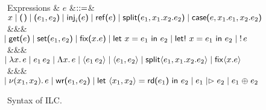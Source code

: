 \begin{figure*}[t]
\begin{comment}
    \tyTensor{X}{Y}$
    \\
    Affine typings
    & $\Delta$
    &$\bnfas$& $\emptyctxt \bnfalt \Delta,x:X \bnfalt \Delta, \wrtok$
  \end{grammar}
  \end{comment}
  \begin{grammar}
    Expressions
    & $e$
        &$\bnfas$&
        $\eVar{x} \bnfalt \eUnit \bnfalt \ePair{e_1}{e_2} \bnfalt \eInj{i}{e}
    \bnfalt \eRef{e} \bnfalt \eSplit{e_1}{x_1}{x_2}{e_2} \bnfalt
    \eCase{e}{x_1}{e_1}{x_2}{e_2}$
    \\ &&& $\bnfaltbrk \eGet{e} \bnfalt \eSet{e_1}{e_2} \bnfalt \eFix{x}{e}
    \bnfalt \eLet{x}{e_1}{e_2} \bnfalt \eLetBang{x}{e_1}{e_2} \bnfalt \eBang{e}$
    \\ &&& $\bnfaltbrk \eLam{x}{e} \bnfalt \eApp{e_1}{e_2} \bnfalt \eLAM{x}{e}
    \bnfalt \eLapp{e_1}{e_2} \bnfalt \eLPair{e_1}{e_2} \bnfalt
    \eLsplit{e_1}{x_1}{x_2}{e_2} \bnfalt \eLfix{x}{e}$
    \\ &&& $\bnfaltbrk \eNu{(x_1,x_2)}{e} \bnfalt \eWr{e_1}{e_2}
    \bnfalt \eLetRd{x_1}{x_2}{e_1}{e_2} \bnfalt \eFork{e_1}{e_2} \bnfalt \eChoice{e_1}{e_2}$
  \end{grammar}
  \caption{Syntax of ILC.}
  \label{fig:ilc-syntax}
\end{figure*}
